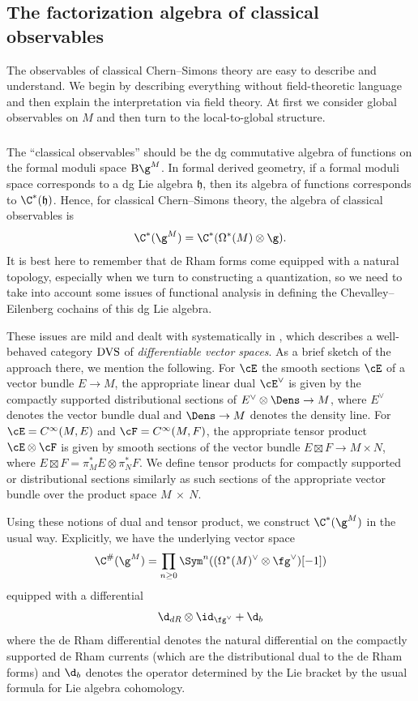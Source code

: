 \documentclass[10pt]{amsart}
\begin{document}
\subsection{The factorization algebra of classical observables}
\label{sec: classical observables}

The observables of classical Chern--Simons theory are easy to describe and understand.
We begin by describing everything without field-theoretic language and 
then explain the interpretation via field theory.
At first we consider global observables on $M$ and then turn to the local-to-global structure.

\subsubsection{}

The ``classical observables'' should be the dg commutative algebra of functions on the formal moduli space ${\rm B}\g^M$.
In formal derived geometry, if a formal moduli space corresponds to a dg Lie algebra $\mathfrak{h}$, 
then its algebra of functions corresponds to $\C^*(\mathfrak{h})$.
Hence, for classical Chern--Simons theory,
the algebra of classical observables is
\[
\C^*(\g^M) = \C^*(\Omega^*(M) \otimes \g).
\]
It is best here to remember that de Rham forms come equipped with a natural topology,
especially when we turn to constructing a quantization,
so we need to take into account some issues of functional analysis in defining the Chevalley--Eilenberg cochains of this dg Lie algebra. 

These issues are mild and dealt with systematically in \cite{CG1},
which describes a well-behaved category ${\rm DVS}$ of {\em differentiable vector spaces}.
As a brief sketch of the approach there, 
we mention the following.
For $\cE$ the smooth sections $\cE$ of a vector bundle $E \to M$,
the appropriate linear dual $\cE^\vee$ is given by the compactly supported distributional sections of $E^\vee \otimes \Dens \to M$,
where $E^\vee$ denotes the vector bundle dual and $\Dens \to M$ denotes the density line.
For $\cE = C^\infty(M,E)$ and $\cF = C^\infty(M,F)$,
the appropriate tensor product $\cE \otimes \cF$ is given by 
smooth sections of the vector bundle $E \boxtimes F \to M \times N$,
where $E \boxtimes F = \pi_M ^*E \otimes \pi_N^*F$.
We define tensor products for compactly supported or distributional sections similarly
as such sections of the appropriate vector bundle over the product space $M~\times~N$.

Using these notions of dual and tensor product, 
we construct $\C^*(\g^M)$ in the usual way.
Explicitly, we have the underlying vector space
\[
\C^\#(\g^M) = \prod_{n \geq 0} \Sym^n((\Omega^*(M)^\vee \otimes \fg^\vee)[-1])
\]
equipped with a differential 
\[
\d_{dR} \otimes \id_{\fg^\vee} + \d_{b}
\]
where the de Rham differential denotes the natural differential on the compactly supported de Rham currents
(which are the distributional dual to the de Rham forms) 
and $\d_b$ denotes the operator determined by the Lie bracket by the usual formula for Lie algebra cohomology.
\end{document}
